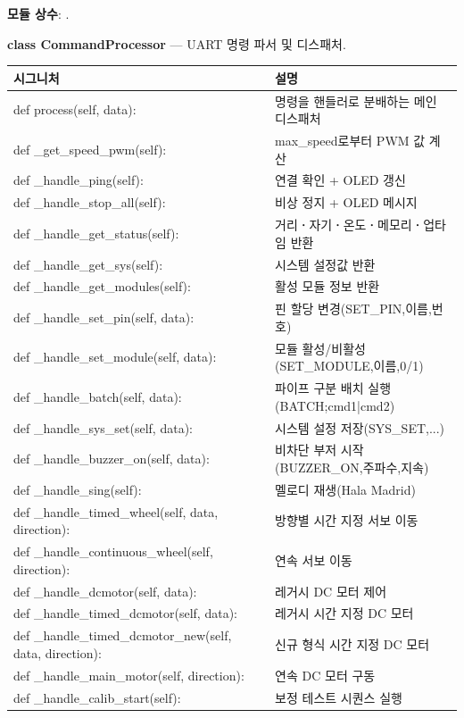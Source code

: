 \noindent\textbf{모듈 상수}: .

\noindent\textbf{class CommandProcessor} --- UART 명령 파서 및 디스패처.

\begin{longtable}{S{7.8cm} L{6.2cm}}
\toprule
{}\normalfont\sffamily\bfseries 시그니처 & \normalfont\sffamily\bfseries 설명 \\
\midrule
\endhead
def process(self, data): & 명령을 핸들러로 분배하는 메인 디스패처 \\
def \_get\_speed\_pwm(self): & max\_speed로부터 PWM 값 계산 \\
def \_handle\_ping(self): & 연결 확인 + OLED 갱신 \\
def \_handle\_stop\_all(self): & 비상 정지 + OLED 메시지 \\
def \_handle\_get\_status(self): & 거리\textbf{·}자기\textbf{·}온도\textbf{·}메모리\textbf{·}업타임 반환 \\
def \_handle\_get\_sys(self): & 시스템 설정값 반환 \\
def \_handle\_get\_modules(self): & 활성 모듈 정보 반환 \\
def \_handle\_set\_pin(self, data): & 핀 할당 변경(SET\_PIN,이름,번호) \\
def \_handle\_set\_module(self, data): & 모듈 활성/비활성(SET\_MODULE,이름,0/1) \\
def \_handle\_batch(self, data): & 파이프 구분 배치 실행(BATCH;cmd1|cmd2) \\
def \_handle\_sys\_set(self, data): & 시스템 설정 저장(SYS\_SET,...) \\
def \_handle\_buzzer\_on(self, data): & 비차단 부저 시작(BUZZER\_ON,주파수,지속) \\
def \_handle\_sing(self): & 멜로디 재생(Hala Madrid) \\
def \_handle\_timed\_wheel(self, data, direction): & 방향별 시간 지정 서보 이동 \\
def \_handle\_continuous\_wheel(self, direction): & 연속 서보 이동 \\
def \_handle\_dcmotor(self, data): & 레거시 DC 모터 제어 \\
def \_handle\_timed\_dcmotor(self, data): & 레거시 시간 지정 DC 모터 \\
def \_handle\_timed\_dcmotor\_new(self, data, direction): & 신규 형식 시간 지정 DC 모터 \\
def \_handle\_main\_motor(self, direction): & 연속 DC 모터 구동 \\
def \_handle\_calib\_start(self): & 보정 테스트 시퀀스 실행 \\

\end{longtable}
